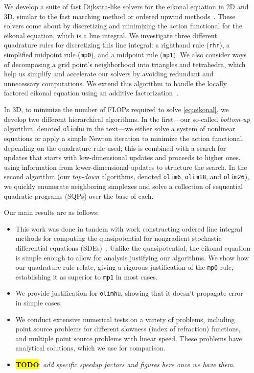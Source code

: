 \documentclass[eikonal.tex]{subfiles}
\begin{document}
We develop a suite of fast Dijkstra-like solvers for the eikonal
equation in 2D and 3D, similar to the fast marching method or ordered
upwind methods~\cite{sethian1996fast,sethian2003ordered}. These
solvers come about by discretizing and minimizing the action
functional for the eikonal equation, which is a line integral. We
investigate three different quadrature rules for discretizing this
line integral: a righthand rule (\texttt{rhr}), a simplified midpoint
rule (\texttt{mp0}), and a midpoint rule (\texttt{mp1}). We also
consider ways of decomposing a grid point's neighborhood into
triangles and tetrahedra, which help us simplify and accelerate our
solvers by avoiding redundant and unnecessary computations. We extend
this algorithm to handle the locally factored eikonal equation using
an additive factorization~\cite{luo2012fast, qi2018corner}.

In 3D, to minimize the number of FLOPs required to solve
\cref{eq:eikonal}, we develop two different hierarchical
algorithms. In the first---our so-called \emph{bottom-up} algorithm,
denoted \texttt{olimhu} in the text---we either solve a system of
nonlinear equations or apply a simple Newton iteration to minimize the
action functional, depending on the quadrature rule used; this is
combined with a search for updates that starts with low-dimensional
updates and proceeds to higher ones, using information from
lower-dimensional updates to structure the search. In the second
algorithm (our \emph{top-down} algorithms, denoted \texttt{olim6},
\texttt{olim18}, and \texttt{olim26}), we quickly enumerate
neighboring simplexes and solve a collection of sequential quadratic
programs (SQPs) over the base of each.

Our main results are as follows:
\begin{itemize}
\item This work was done in tandem with work constructing ordered line
  integral methods for computing the quasipotential for nongradient
  stochastic differential equations
  (SDEs)~\cite{dahiya2017ordered,yang2018computing,dahiya2018ordered}. Unlike
  the quasipotential, the eikonal equation is simple enough to allow
  for analysis justifying our algorithms. We show how our quadrature
  rule relate, giving a rigorous justification of the \texttt{mp0}
  rule, establishing it as superior to \texttt{mp1} in most
  cases.
\item We provide justification for \texttt{olimhu}, showing that it
  doesn't propagate error in simple cases.
\item We conduct extensive numerical tests on a variety of problems,
  including point source problems for different slowness (index of
  refraction) functions, and multiple point source problems with
  linear speed. These problems have analytical solutions, which we use
  for comparison.
\item \textbf{\hl{TODO}}: \emph{add specific speedup factors and
    figures here once we have them}.
\end{itemize}
\end{document}
